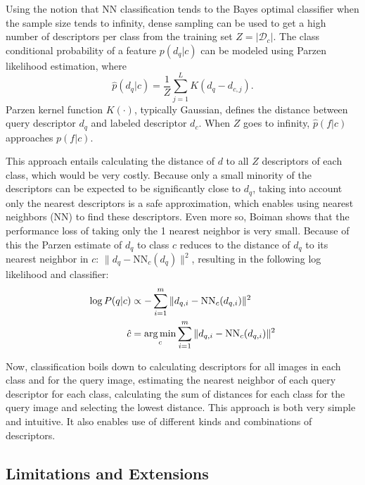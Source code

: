 Using the notion that NN classification tends to the Bayes optimal classifier when the sample size tends to infinity\cite{boiman2008defense, cover1967nearest}, dense sampling can be used to get a high number of descriptors per class from the training set $Z = |\mathcal{D}_c|$. The class conditional probability of a feature $p(d_q|c)$ can be modeled using Parzen likelihood estimation, where
\begin{equation} \label{eq:parzen}
    \hat p(d_q|c) = \frac{1}{Z}\sum_{j=1}^L K(d_q-d_{c,j}).
\end{equation}
Parzen kernel function $K(\cdot)$, typically Gaussian, defines the distance between query descriptor $d_{q}$ and labeled descriptor $d_{c}$. When $Z$ goes to infinity, $\hat p(f|c)$ approaches $p(f|c)$. 

This approach entails calculating the distance of $d$ to all $Z$ descriptors of each class, which would be very costly. Because only a small minority of the descriptors can be expected to be significantly close to $d_q$, taking into account only the nearest descriptors is a safe approximation, which enables using nearest neighbors (NN) to find these descriptors. Even more so, Boiman shows that the performance loss of taking only the 1 nearest neighbor is very small. Because of this the Parzen estimate of $d_q$ to class $c$ reduces to the distance of $d_q$ to its nearest neighbor in $c$: $\|d_q - \text{NN}_c(d_q)\|^2$, resulting in the following log likelihood and classifier: 
\begin{align}
    \label{eq:nbnnloglikelihood}
    \log P(q|c) &\propto -\sum_{i=1}^m \|d_{q,i} - \text{NN}_c(d_{q,i})\|^2 \\
    \label{eq:nbnnclass}
    \hat c      &= \operatorname*{arg\,min}_c \sum_{i=1}^m \|d_{q,i} - \text{NN}_c(d_{q,i})\|^2
\end{align}

Now, classification boils down to calculating descriptors for all images in each class and for the query image, estimating the nearest neighbor of each query descriptor for each class, calculating the sum of distances for each class for the query image and selecting the lowest distance. This approach is both very simple and intuitive. It also enables use of different kinds and combinations of descriptors.



\subsection{Limitations and Extensions} %
\label{sub:limitations_and_extensions}

